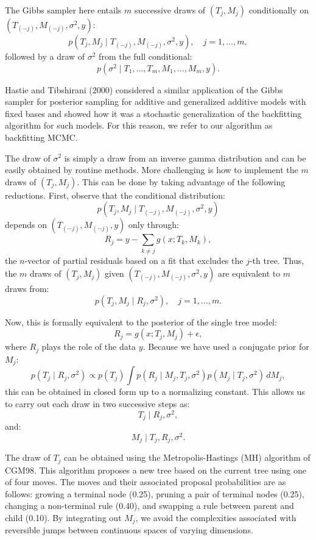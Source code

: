\documentclass[a4paper,11pt]{article}
\begin{document}
The Gibbs sampler here entails \( m \) successive draws of \( (T_j, M_j) \) conditionally on \( (T_{(-j)}, M_{(-j)}, \sigma^2, y) \):
\[
p(T_j, M_j \mid T_{(-j)}, M_{(-j)}, \sigma^2, y), \quad j = 1, \ldots, m,
\]
followed by a draw of \( \sigma^2 \) from the full conditional:
\[
p\left(\sigma^2 \mid T_1, \ldots, T_m, M_1, \ldots, M_m, y\right).
\]

Hastie and Tibshirani (2000) considered a similar application of the Gibbs sampler for posterior sampling for additive and generalized additive models with fixed bases and showed how it was a stochastic generalization of the backfitting algorithm for such models. For this reason, we refer to our algorithm as backfitting MCMC.

The draw of \( \sigma^2 \) is simply a draw from an inverse gamma distribution and can be easily obtained by routine methods. More challenging is how to implement the \( m \) draws of \( (T_j, M_j) \). This can be done by taking advantage of the following reductions. First, observe that the conditional distribution:
\[
p\left(T_j, M_j \mid T_{(-j)}, M_{(-j)}, \sigma^2, y\right)
\]
depends on \( (T_{(-j)}, M_{(-j)}, y) \) only through:
\[
R_j = y - \sum_{k \neq j} g(x; T_k, M_k),
\]
the \( n \)-vector of partial residuals based on a fit that excludes the \( j \)-th tree. Thus, the \( m \) draws of \( (T_j, M_j) \) given \( (T_{(-j)}, M_{(-j)}, \sigma^2, y) \) are equivalent to \( m \) draws from:
\[
p(T_j, M_j \mid R_j, \sigma^2), \quad j = 1, \ldots, m.
\]

Now, this is formally equivalent to the posterior of the single tree model:
\[
R_j = g(x; T_j, M_j) + \epsilon,
\]
where \( R_j \) plays the role of the data \( y \). Because we have used a conjugate prior for \( M_j \):
\[
p(T_j \mid R_j, \sigma^2) \propto p(T_j) \int p(R_j \mid M_j, T_j, \sigma^2) p(M_j \mid T_j, \sigma^2) \, dM_j,
\]
this can be obtained in closed form up to a normalizing constant. This allows us to carry out each draw in two successive steps as:
\[
T_j \mid R_j, \sigma^2,
\]
and:
\[
M_j \mid T_j, R_j, \sigma^2.
\]

The draw of \( T_j \) can be obtained using the Metropolis-Hastings (MH) algorithm of CGM98. This algorithm proposes a new tree based on the current tree using one of four moves. The moves and their associated proposal probabilities are as follows: growing a terminal node (0.25), pruning a pair of terminal nodes (0.25), changing a non-terminal rule (0.40), and swapping a rule between parent and child (0.10). By integrating out \( M_j \), we avoid the complexities associated with reversible jumps between continuous spaces of varying dimensions.
\end{document}
